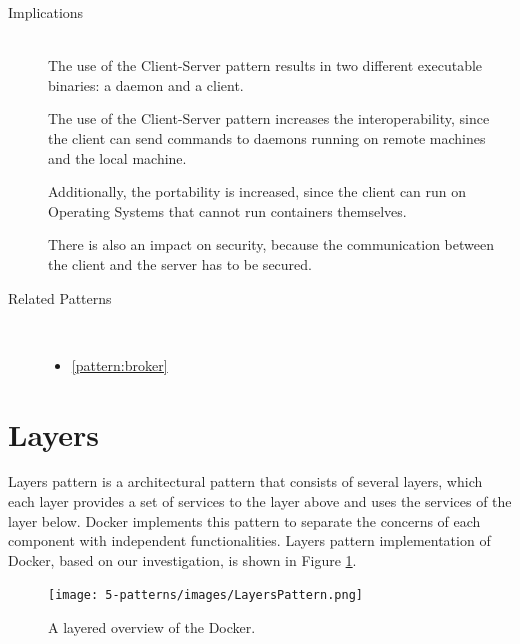 \begin{description}
\item [Implications]~\\
The use of the {Client-Server} pattern results in two different executable binaries: a daemon and a client. 

The use of the {Client-Server} pattern increases the interoperability, since the client can send commands to daemons running on remote machines and the local machine.

Additionally, the portability is increased, since the client can run on Operating Systems that cannot run containers themselves.

There is also an impact on security, because the communication between the client and the server has to be secured.

\item [Related Patterns]~
\begin{itemize}
\item \ref{pattern:broker}
\end{itemize}

\end{description}

\section{Layers}
Layers pattern is a architectural pattern that consists of several layers, which
each layer provides a set of services to the layer above and uses the services
of the layer below. Docker implements this pattern to separate the concerns of
each component with independent functionalities. Layers pattern implementation
of Docker, based on our investigation, is shown in Figure \ref{fig:layers-pattern}.

\begin{figure}[H]
\centering
\texttt{[image: 5-patterns/images/LayersPattern.png]}
\caption{A layered overview of the Docker.}
\label{fig:layers-pattern}
\end{figure}

